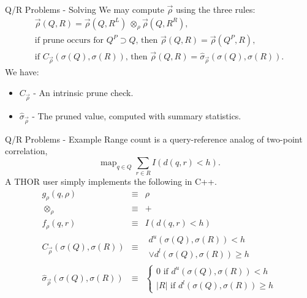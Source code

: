 \documentclass[pdf,colorBG,slideColor]{prosper}
\newcommand{\itemt}[1]{\item {\bf #1} -}
\newcommand{\summary}{\hat{\sigma}}
\DeclareMathOperator*{\map}{map}
\newcommand{\kdleft}[1]{#1^{\!L}}
\newcommand{\kdright}[1]{#1^{\!R}}
\newcommand{\kdparent}[1]{#1^{\!P}}
\newcommand{\lo}[1]{#1^{l}}
\newcommand{\up}[1]{#1^{u}}
\newcommand{\distlo}{\lo{d}}
\newcommand{\distup}{\up{d}}
\newcommand{\dist}[2]{d(#1,#2)}
\newcommand{\nameop}[2]{{\scriptstyle\:}#1_{\!#2}}
\newcommand{\myop}[1]{\nameop{\otimes}{#1}}
\newcommand{\letterqr}{\rho}
\newcommand{\inqr}{\rho}
\newcommand{\opqr}{\myop{\letterqr}}
\newcommand{\fqr}{f_{\!\letterqr}}
\newcommand{\gqr}{g_{\!\letterqr}}
\newcommand{\letterqrv}{\vec{\rho}}
\newcommand{\inqrv}{\vec{\rho}}
\newcommand{\deltaqrv}{\summary_{\!\letterqrv}}
\newcommand{\canpruneqrv}{C_{\!\letterqrv}}
\newcommand{\outstat}{\sigma}
\begin{document}
\begin{slide}{Q/R Problems - Solving}
  We may compute $\inqrv$ using the three rules:
  \[\begin{array}{l}
    \inqrv(Q, R) = \inqrv(Q, \kdleft{R}) \opqr \inqrv(Q, \kdright{R}),
    \\
    \text{if prune occurs for } \kdparent{Q} \supset Q \text{, then } \inqrv(Q, R) = \inqrv(\kdparent{Q}, R),
    \\
    \text{if } \canpruneqrv(\outstat(Q), \outstat(R)) \text{, then } \inqrv(Q, R) = \deltaqrv(\outstat(Q), \outstat(R)).
  \end{array}\]
  We have:
  \begin{itemize}
    \itemt{$\canpruneqrv$} An intrinsic prune check.
    \itemt{$\deltaqrv$} The pruned value, computed with summary statistics.
  \end{itemize}
\end{slide}

\begin{slide}{Q/R Problems - Example}
  Range count is a query-reference analog of two-point correlation,
  \[\map_{q \in Q} \sum_{r \in R} I(\dist{q}{r} < h).\]
  A THOR user simply implements the following in C++.
  \begin{eqnarray*}
  \gqr(q, \inqr) &\equiv& \inqr
  \\
  \opqr &\equiv& +
  \\
  \fqr(q,r) &\equiv& I(\dist{q}{r} < h)
  \\
  \canpruneqrv(\sigma(Q), \sigma(R))
  &\equiv&
  \begin{array}{l}\distup(\outstat(Q),\outstat(R)) < h \\ \vee \distlo(\outstat(Q),\outstat(R)) \geq h\end{array}
  \\
  \deltaqrv(\outstat(Q),\outstat(R)) &\equiv& \left\{ \begin{array}{l} 0 \text{ if } \distup(\outstat(Q),\outstat(R)) < h \\ |R| \text{ if } \distlo(\outstat(Q),\outstat(R)) \geq h \end{array}\right.
  \end{eqnarray*}
\end{slide}
\end{document}
